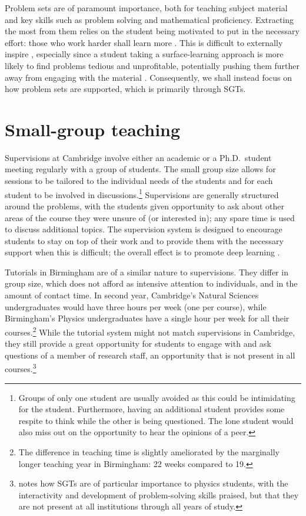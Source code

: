 Problem sets are of paramount importance, both for teaching subject material and key skills such as problem solving and mathematical proficiency. Extracting the most from them relies on the student being motivated to put in the necessary effort: those who work harder shall learn more \citep{Gibbs2015}. This is difficult to externally inspire \citep[cf.][]{Ryan2000}, especially since a student taking a surface-learning approach is more likely to find problems tedious and unprofitable, potentially pushing them further away from engaging with the material \citep[chapter 4]{Ramsden1992}. Consequently, we shall instead focus on how problem sets are supported, which is primarily through SGTs.

\section{Small-group teaching}\label{sec:small}

Supervisions at Cambridge involve either an academic or a Ph.D.\ student meeting regularly with a group of students. The small group size allows for sessions to be tailored to the individual needs of the students and for each student to be involved in discussions.\footnote{Groups of only one student are usually avoided as this could be intimidating for the student. Furthermore, having an additional student provides some respite to think while the other is being questioned. The lone student would also miss out on the opportunity to hear the opinions of a peer.} Supervisions are generally structured around the problems, with the students given opportunity to ask about other areas of the course they were unsure of (or interested in); any spare time is used to discuss additional topics. The supervision system is designed to encourage students to stay on top of their work and to provide them with the necessary support when this is difficult; the overall effect is to promote deep learning \citep[case study 14.1]{Gibbs2015}.

Tutorials in Birmingham are of a similar nature to supervisions. They differ in group size, which does not afford as intensive attention to individuals, and in the amount of contact time. In second year, Cambridge's Natural Sciences undergraduates would have three hours per week (one per course), while Birmingham's Physics undergraduates have a single hour per week for all their courses.\footnote{The difference in teaching time is slightly ameliorated by the marginally longer teaching year in Birmingham: 22 weeks compared to 19.} While the tutorial system might not match supervisions in Cambridge, they still provide a great opportunity for students to engage with and ask questions of a member of research staff, an opportunity that is not present in all courses.\footnote{\citet{Sharma2007} notes how SGTs are of particular importance to physics students, with the interactivity and development of problem-solving skills praised, but that they are not present at all institutions through all years of study.}

